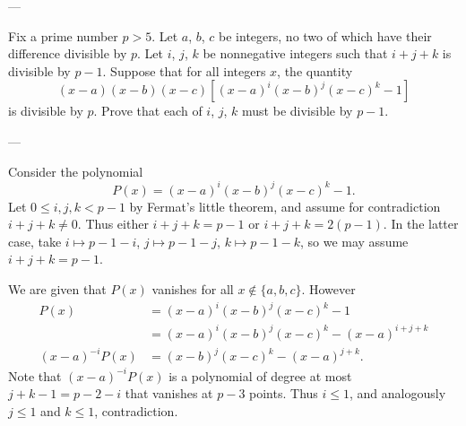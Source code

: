 
---

Fix a prime number $p>5$. Let $a$, $b$, $c$ be integers, no two of which have their difference divisible by $p$. Let $i$, $j$, $k$ be nonnegative integers such that $i+j+k$ is divisible by $p-1$. Suppose that for all integers $x$, the quantity \[(x-a)(x-b)(x-c)\left[(x-a)^i(x-b)^j(x-c)^k-1\right]\]
is divisible by $p$. Prove that each of $i$, $j$, $k$ must be divisible by $p-1$.

---

Consider the polynomial \[P(x)=(x-a)^i(x-b)^j(x-c)^k-1.\]
Let $0\le i,j,k<p-1$ by Fermat's little theorem, and assume for contradiction $i+j+k\ne0$. Thus either $i+j+k=p-1$ or $i+j+k=2(p-1)$. In the latter case, take $i\mapsto p-1-i$, $j\mapsto p-1-j$, $k\mapsto p-1-k$, so we may assume $i+j+k=p-1$.

We are given that $P(x)$ vanishes for all $x\not\in\{a,b,c\}$. However
\begin{align*}
    P(x)&=(x-a)^i(x-b)^j(x-c)^k-1\\
    &=(x-a)^i(x-b)^j(x-c)^k-(x-a)^{i+j+k}\\
    (x-a)^{-i}P(x)&=(x-b)^j(x-c)^k-(x-a)^{j+k}.
\end{align*}
Note that $(x-a)^{-i}P(x)$ is a polynomial of degree at most $j+k-1=p-2-i$ that vanishes at $p-3$ points. Thus $i\le1$, and analogously $j\le1$ and $k\le1$, contradiction.




